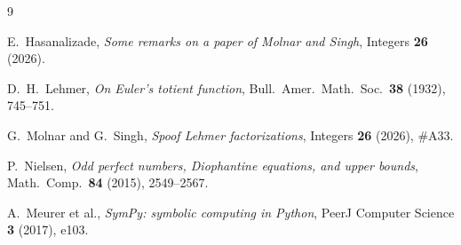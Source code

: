 \documentclass[11pt]{article}
\theoremstyle{definition}
\theoremstyle{remark}
\begin{document}
\begin{thebibliography}{9}

E.~Hasanalizade, \emph{Some remarks on a paper of Molnar and Singh},
Integers \textbf{26} (2026).

D.~H.~Lehmer, \emph{On Euler's totient function}, Bull.\ Amer.\ Math.\
Soc.\ \textbf{38} (1932), 745--751.

G.~Molnar and G.~Singh, \emph{Spoof Lehmer factorizations}, Integers
\textbf{26} (2026), \#A33.

P.~Nielsen, \emph{Odd perfect numbers, Diophantine equations, and upper
bounds}, Math.\ Comp.\ \textbf{84} (2015), 2549--2567.

A.~Meurer et al., \emph{SymPy: symbolic computing in Python}, PeerJ
Computer Science \textbf{3} (2017), e103.

\end{thebibliography}
\end{document}
